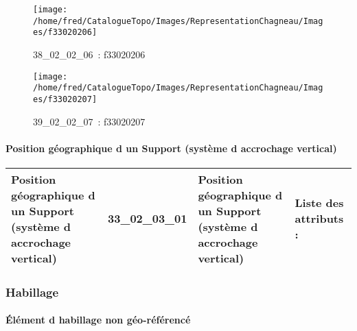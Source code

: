 \documentclass[12pt,titlepage]{book}
\begin{document}
\begin{figure}[h!]
\begin{minipage}[t]{3cm}
    \begin{center}
      \texttt{[image: /home/fred/CatalogueTopo/Images/RepresentationChagneau/Images/f33020206]}
      \caption[~38\_02\_02\_06]{\small{38\_02\_02\_06~:} \tiny{f33020206}}\label{f33020206}
    \end{center}
  \end{minipage}
  \begin{minipage}[t]{3cm}
    \begin{center}
      \texttt{[image: /home/fred/CatalogueTopo/Images/RepresentationChagneau/Images/f33020207]}
      \caption[~39\_02\_02\_07]{\small{39\_02\_02\_07~:} \tiny{f33020207}}\label{f33020207}
    \end{center}
  \end{minipage}
\end{figure}


\paragraph{Position géographique d un Support (système d accrochage vertical)}
\noindent
\vspace{\baselineskip}

\renewcommand{\arraystretch}{1.2}
\begin{supertabular}{|p{10cm}|c|p{13cm}|p{12cm}|}
 Position géographique d un Support (système d accrochage vertical) & 33\_02\_03\_01 & Position géographique d un Support (système d accrochage vertical) & Liste des attributs :
\begin{enumerate}
\end{enumerate}
\\
\hline
\end{supertabular}
\begin{figure}[h!]
  \hfill         %
\end{figure}

\subsubsection{\large Habillage}
\paragraph{Élément d habillage non géo-référencé}
\noindent
\vspace{\baselineskip}
\end{document}
